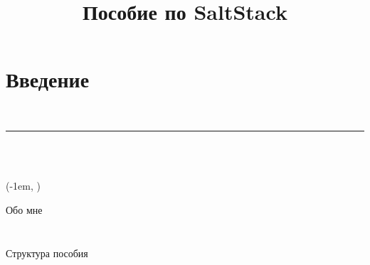 ﻿


\title{Пособие по SaltStack}



\section{Введение}

\begin{bg-frame}
  \vspace{1.50\baselineskip}
  {\Huge \inserttitle\\}
  \rule{180pt}{}\\
  \insertauthor{} \insertcontacts{}\\
  \vspace{0.25\baselineskip}
  \inserthomepage{}

  \newlength{\blockheight}
  \setlength{\blockheight}{\dimexpr(\textheight)-\baselineskip}
  \begin{textblock*}{\paperwidth} (-1em, \blockheight)
    \tiny \raggedleft{}
  \end{textblock*}

\end{bg-frame}

\begin{Frame}[t]{Обо мне}
  \begin{columns}[c]
    \begin{column}{0.35\textwidth}
      \begin{figure}
      \end{figure}
    \end{column}
    \begin{column}{0.65\textwidth}
      {\large \insertauthor{}}
      \baselinespace{}
      \insertreaderbrief{}
    \end{column}
  \end{columns}
\end{Frame}

\begin{Frame}[c]{Структура пособия}
  \centering


\end{Frame}

